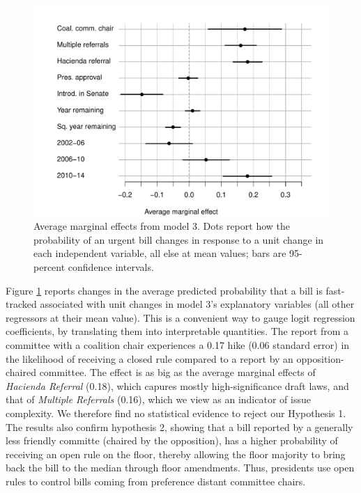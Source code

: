\documentclass[letter,12pt]{article}
\begin{document}
\begin{figure}
  \centering
    \caption{Average marginal effects from model 3. Dots report how the probability of an urgent bill changes in response to a unit change in each independent variable, all else at mean values; bars are 95-percent confidence intervals.}\label{F:avgMg}
    \includegraphics[width=.8\columnwidth]{../graphs/avgMgEffects.pdf}
\end{figure}

Figure \ref{F:avgMg} reports changes in the average predicted probability that a bill is fast-tracked associated with unit changes in model 3's explanatory variables (all other regressors at their mean value). This is a convenient way to gauge logit regression coefficients, by translating them into interpretable quantities. The report from a committee with a coalition chair experiences a 0.17 hike (0.06 standard error) in the likelihood of receiving a closed rule compared to a report by an opposition-chaired committee. The effect is as big as the average marginal effects of \emph{Hacienda Referral} (0.18), which capures mostly high-significance draft laws, and that of \emph{Multiple Referrals} (0.16), which we view as an indicator of issue complexity. We therefore find no statistical evidence to reject our Hypothesis 1. The results also confirm hypothesis 2, showing that a bill reported by a generally less friendly committe (chaired by the opposition), has a higher probability of receiving an open rule on the floor, thereby allowing the floor majority to bring back the bill to the median through floor amendments. Thus, presidents use open rules to control bills coming from preference distant committee chairs.
\end{document}

